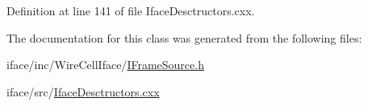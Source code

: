 Definition at line 141 of file Iface\+Desctructors.\+cxx.



The documentation for this class was generated from the following files\+:\begin{DoxyCompactItemize}
\item 
iface/inc/\+Wire\+Cell\+Iface/\hyperlink{_i_frame_source_8h}{I\+Frame\+Source.\+h}\item 
iface/src/\hyperlink{_iface_desctructors_8cxx}{Iface\+Desctructors.\+cxx}\end{DoxyCompactItemize}
